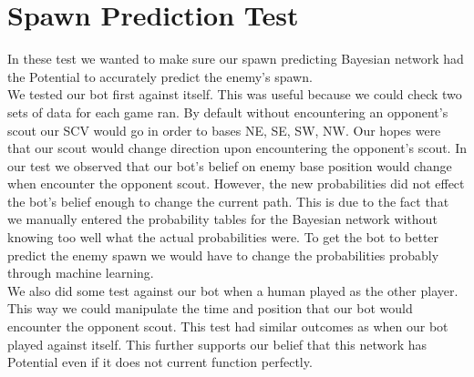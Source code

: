 \section{Spawn Prediction Test}
In these test we wanted to make sure our spawn predicting Bayesian network had the Potential to accurately predict the enemy's spawn.\\

We tested our bot first against itself. This was useful because we could check two sets of data for each game ran. By default without encountering an opponent's scout our SCV would go in order to bases NE, SE, SW, NW. Our hopes were that our scout would change direction upon encountering the opponent's scout. In our test we observed that our bot's belief on enemy base position would change when encounter the opponent scout. However, the new probabilities did not effect the bot's belief enough to change the current path. This is due to the fact that we manually entered the probability tables for the Bayesian network without knowing too well what the actual probabilities were. To get the bot to better predict the enemy spawn we would have to change the probabilities probably through machine learning. \\

We also did some test against our bot when a human played as the other player. This way we could manipulate the time and position that our bot would encounter the opponent scout. This test had similar outcomes as when our bot played against itself. This further supports our belief that this network has Potential even if it does not current function perfectly.


